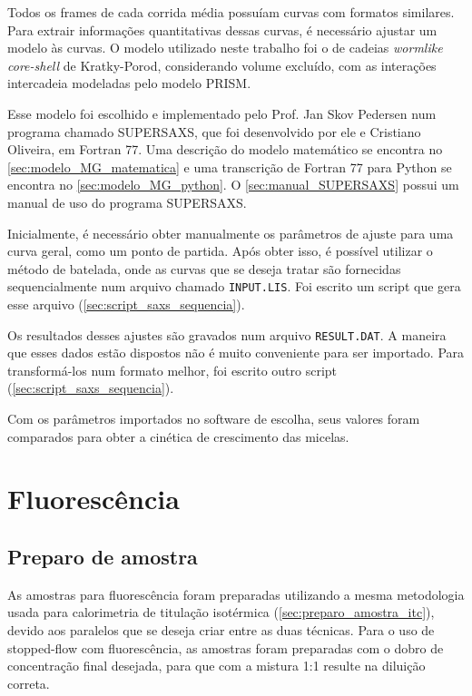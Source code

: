 			Todos os frames de cada corrida média possuíam curvas com formatos similares. Para extrair informações quantitativas dessas curvas, é necessário ajustar um modelo às curvas. O modelo utilizado neste trabalho foi o de cadeias \emph{wormlike} \emph{core-shell} de Kratky-Porod, considerando volume excluído, com as interações intercadeia modeladas pelo modelo PRISM. 
			
			Esse modelo foi escolhido e implementado pelo Prof. Jan Skov Pedersen num programa chamado SUPERSAXS, que foi desenvolvido por ele e Cristiano Oliveira, em Fortran 77. Uma descrição do modelo matemático se encontra no \autoref{sec:modelo_MG_matematica} e uma transcrição de Fortran 77 para Python se encontra no \autoref{sec:modelo_MG_python}. O \autoref{sec:manual_SUPERSAXS} possui um manual de uso do programa SUPERSAXS.
			
			Inicialmente, é necessário obter manualmente os parâmetros de ajuste para uma curva geral, como um ponto de partida. Após obter isso, é possível utilizar o método de batelada, onde as curvas que se deseja tratar são fornecidas sequencialmente num arquivo chamado \texttt{INPUT.LIS}. Foi escrito um script que gera esse arquivo (\autoref{sec:script_saxs_sequencia}). 
			
			Os resultados desses ajustes são gravados num arquivo \texttt{RESULT.DAT}. A maneira que esses dados estão dispostos não é muito conveniente para ser importado. Para transformá-los num formato melhor, foi escrito outro script (\autoref{sec:script_saxs_sequencia}).
			
			Com os parâmetros importados no software de escolha, seus valores foram comparados para obter a cinética de crescimento das micelas.
			
	\chapter{Fluorescência}  
		\section{Preparo de amostra}
		
		As amostras para fluorescência foram preparadas utilizando a mesma metodologia usada para calorimetria de titulação isotérmica (\autoref{sec:preparo_amostra_itc}), devido aos paralelos que se deseja criar entre as duas técnicas. Para o uso de stopped-flow com fluorescência, as amostras foram preparadas com o dobro de concentração final desejada, para que com a mistura 1:1 resulte na diluição correta.
		
